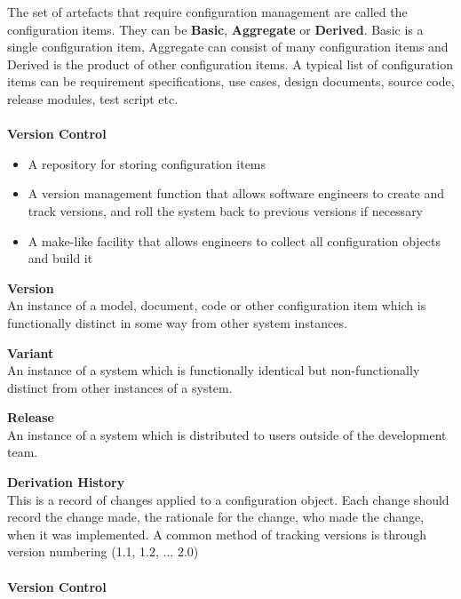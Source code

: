\documentclass[a4paper,10pt]{article}
\begin{document}
The set of artefacts that require configuration management are called the configuration items. They can be \textbf{Basic}, \textbf{Aggregate} or \textbf{Derived}. Basic is a single configuration item, Aggregate can consist of many configuration items and Derived is the product of other configuration items. A typical list of configuration items can be requirement specifications, use cases, design documents, source code, release modules, test script etc. \\\\
\textcolor{BlueGreen}{\textbf{Version Control}} 
\begin{itemize}
	\item A repository for storing configuration items 
	\item A version management function that allows software engineers to create and track versions, and roll the system back to previous versions if necessary
	\item A make-like facility that allows engineers to collect all configuration objects and build it 
\end{itemize}
\begin{shaded}
\noindent \textcolor{BlueGreen}{\textbf{Version}} \\
An instance of a model, document, code or other configuration item which is functionally distinct in some way from other system instances. 
\end{shaded}
\begin{shaded}
	\noindent \textcolor{BlueGreen}{\textbf{Variant}} \\
	An instance of a system which is functionally identical but non-functionally distinct from other instances of a system.  
\end{shaded}
\begin{shaded}
	\noindent \textcolor{BlueGreen}{\textbf{Release}} \\
	An instance of a system which is distributed to users outside of the development team. 
\end{shaded}
\textcolor{BlueGreen}{\textbf{Derivation History}} \\ 
This is a record of changes applied to a configuration object. Each change should record the change made, the rationale for the change, who made the change, when it was implemented. A common method of tracking versions is through version numbering (1.1, 1.2, ... 2.0) \\\\
\textcolor{BlueGreen}{\textbf{Version Control}} \\
\end{document}
